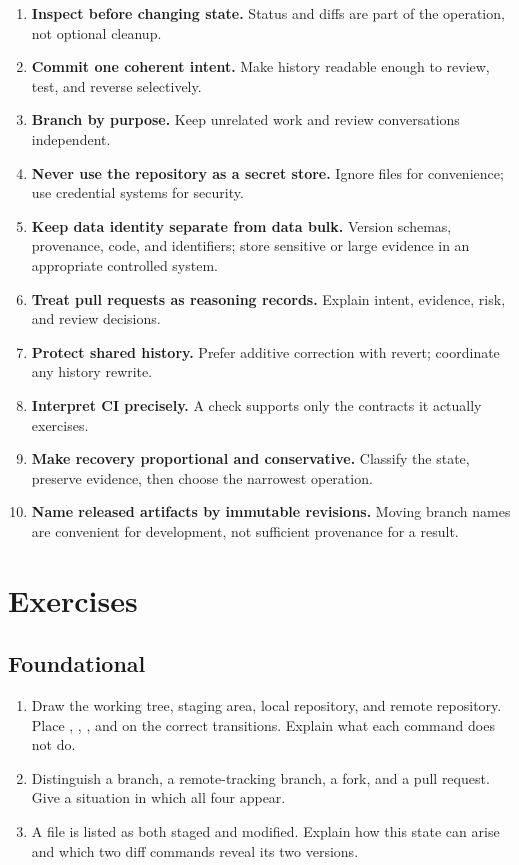 \begin{enumerate}
  \item \textbf{Inspect before changing state.} Status and diffs are part of the
  operation, not optional cleanup.
  \item \textbf{Commit one coherent intent.} Make history readable enough to
  review, test, and reverse selectively.
  \item \textbf{Branch by purpose.} Keep unrelated work and review conversations
  independent.
  \item \textbf{Never use the repository as a secret store.} Ignore files for
  convenience; use credential systems for security.
  \item \textbf{Keep data identity separate from data bulk.} Version schemas,
  provenance, code, and identifiers; store sensitive or large evidence in an
  appropriate controlled system.
  \item \textbf{Treat pull requests as reasoning records.} Explain intent,
  evidence, risk, and review decisions.
  \item \textbf{Protect shared history.} Prefer additive correction with revert;
  coordinate any history rewrite.
  \item \textbf{Interpret CI precisely.} A check supports only the contracts it
  actually exercises.
  \item \textbf{Make recovery proportional and conservative.} Classify the state,
  preserve evidence, then choose the narrowest operation.
  \item \textbf{Name released artifacts by immutable revisions.} Moving branch
  names are convenient for development, not sufficient provenance for a result.
\end{enumerate}

\section{Exercises}

\subsection*{Foundational}

\begin{enumerate}
  \item Draw the working tree, staging area, local repository, and remote
  repository. Place , , , and  on
  the correct transitions. Explain what each command does not do.
  \item Distinguish a branch, a remote-tracking branch, a fork, and a pull
  request. Give a situation in which all four appear.
  \item A file is listed as both staged and modified. Explain how this state can
  arise and which two diff commands reveal its two versions.
\end{enumerate}

